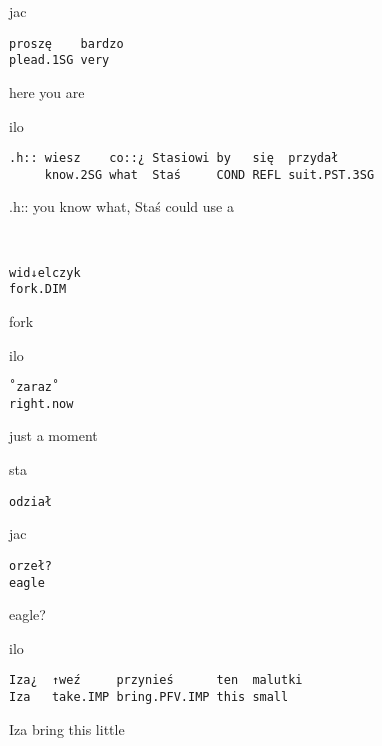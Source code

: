\documentclass[output=paper]{langsci/langscibook}
\begin{document}
\vspace{2mm}
%
\begin{transbox}{1}{jac}
\begin{verbatim}
proszę    bardzo
plead.1SG very
\end{verbatim}
here you are
\end{transbox}
%
\begin{mdframednoverticalspace}[style=firstfoc]
\begin{transbox}{2}{ilo}
\begin{verbatim}
.h:: wiesz    co::¿ Stasiowi by   się  przydał
     know.2SG what  Staś     COND REFL suit.PST.3SG
\end{verbatim}
.h:: you know what, Staś could use a
\end{transbox}
\end{mdframednoverticalspace}
%
\begin{mdframednoverticalspace}[style=firstfoc]
\begin{transbox}{3}{~}
\begin{verbatim}
wid↓elczyk
fork.DIM
\end{verbatim}
fork
\end{transbox}
\end{mdframednoverticalspace}
%
%
\begin{transbox}{5}{ilo}
\begin{verbatim}
˚zaraz˚
right.now
\end{verbatim}
just a moment
\end{transbox}
%
\begin{transbox}{6}{sta}
\begin{verbatim}
odział
\end{verbatim}
\end{transbox}
%
\begin{transbox}{7}{jac}
\begin{verbatim}
orzeł?
eagle
\end{verbatim}
eagle?
\end{transbox}
%
\begin{mdframednoverticalspace}[style=firstfoc]
\begin{transbox}{8}{ilo}
\begin{verbatim}
Iza¿  ↑weź     przynieś      ten  malutki
Iza   take.IMP bring.PFV.IMP this small
\end{verbatim}
Iza bring this little
\end{transbox}
\end{mdframednoverticalspace}
\end{document}
